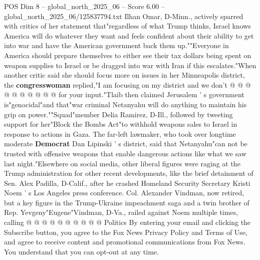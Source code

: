 \begin{textsample}{POS Dim 8 – global\_north\_2025\_06 – Score 6.00 – global\_north\_2025\_06/125837794.txt}
Ilhan Omar, D-Minn., actively sparred with critics of her statement that"regardless of what Trump thinks, Israel knows America will do whatever they want and feels confident about their ability to get into war and have the American government back them up.""Everyone in America should prepare themselves to either see their tax dollars being spent on weapon supplies to Israel or be dragged into war with Iran if this escalates."When another critic said she should focus more on issues in her Minneapolis district, the \textbf{congresswoman} replied,"I am focusing on my district and we don't @ @ @ @ @ @ @ @ @ @ for your input."Tlaib then claimed Jerusalem ' s government is"genocidal"and that"war criminal Netanyahu will do anything to maintain his grip on power.""Squad"member Delia Ramirez, D-Ill., followed by tweeting support for her"Block the Bombs Act"to withhold weapons sales to Israel in response to actions in Gaza.
The far-left lawmaker, who took over longtime moderate \textbf{Democrat} Dan Lipinski ' s district, said that Netanyahu"can not be trusted with offensive weapons that enable dangerous actions like what we saw last night."Elsewhere on social media, other liberal figures were raging at the Trump administration for other recent developments, like the brief detainment of Sen.
Alex Padilla, D-Calif., after he crashed Homeland Security Secretary Kristi Noem ' s Los Angeles press conference.
Col.
Alexander Vindman, now retired, but a key figure in the Trump-Ukraine impeachment saga and a twin brother of Rep.
Yevgeny"Eugene"Vindman, D-Va., railed against Noem multiple times, calling @ @ @ @ @ @ @ @ @ @ Politics By entering your email and clicking the Subscribe button, you agree to the Fox News Privacy Policy and Terms of Use, and agree to receive content and promotional communications from Fox News.
You understand that you can opt-out at any time.

\end{textsample}
